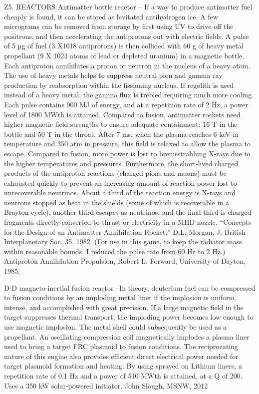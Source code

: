 \documentclass[a4paper]{book}
\begin{document}
Z5. REACTORS
Antimatter bottle reactor – If a way to produce antimatter fuel cheaply is found, it can be stored as levitated antihydrogen ice. A few micrograms can be removed from storage by first using UV to drive off the positrons, and then accelerating the antiprotons out with electric fields. A pulse of 5 µg of fuel (3 X1018 antiprotons) is then collided with 60 g of heavy metal propellant (9 X 1024 atoms of lead or depleted uranium) in a magnetic bottle. Each antiproton annihilates a proton or neutron in the nucleus of a heavy atom.  The use of heavy metals helps to suppress neutral pion and gamma ray production by reabsorption within the fissioning nucleus. If regolith is used instead of a heavy metal, the gamma flux is trebled requiring much more cooling.  Each pulse contains 900 MJ of energy, and at a repetition rate of 2 Hz, a power level of 1800 MWth is attained. Compared to fusion, antimatter rockets need higher magnetic field strengths to ensure adequate containment: 16 T in the bottle and 50 T in the throat. After 7 ms, when the plasma reaches 6 keV in temperature and 350 atm in pressure, this field is relaxed to allow the plasma to escape. Compared to fusion, more power is lost to bremsstrahlung X-rays due to the higher temperatures and pressures. Furthermore, the short-lived charged products of the antiproton reactions (charged pions and muons) must be exhausted quickly to prevent an increasing amount of reaction power lost to unrecoverable neutrinos. About a third of the reaction energy is X-rays and neutrons stopped as heat in the shields (some of which is recoverable in a Brayton cycle), another third escapes as neutrinos, and the final third is charged fragments directly converted to thrust or electricity in a MHD nozzle. “Concepts for the Design of an Antimatter Annihilation Rocket,”  D.L. Morgan,  J. British Interplanetary Soc. 35, 1982.  (For use in this game, to keep the radiator mass within reasonable bounds, I reduced the pulse rate from 60 Hz to 2 Hz.)  Antiproton Annihilation Propulsion, Robert L. Forward, University of Dayton, 1985.
 
 
D-D magneto-inertial fusion reactor –In theory, deuterium fuel can be compressed to fusion conditions by an imploding metal liner if the implosion is uniform, intense, and accomplished with great precision.  If a large magnetic field in the target suppresses thermal transport, the imploding power becomes low enough to use magnetic implosion. The metal shell could subsequently be used as a propellant. An oscillating compression coil magnetically implodes a plasma liner used to bring a target FRC plasmoid to fusion conditions. The reciprocating nature of this engine also provides efficient direct electrical power needed for target plasmoid formation and heating. By using sprayed on Lithium liners, a repetition rate of 0.1 Hz and a power of 510 MWth is attained, at a Q of 200. Uses a 350 kW solar-powered initiator. John Slough, MSNW, 2012
\end{document}
